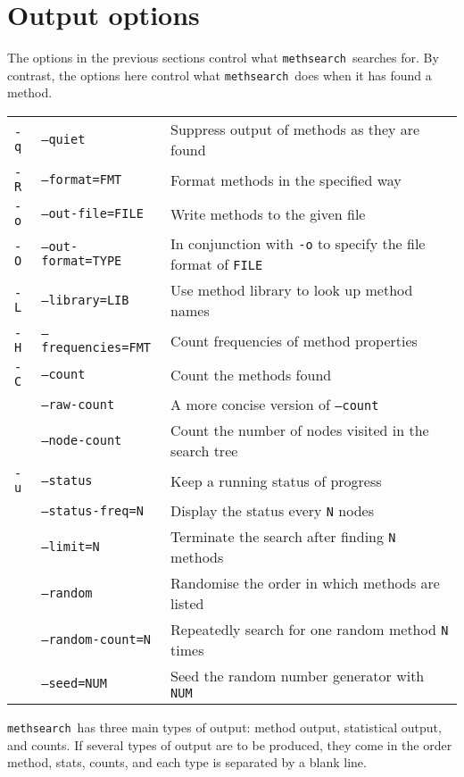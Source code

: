 \documentclass[a4paper,11pt,oneside]{book}
\def\methsearch{\texttt{meth\-search}}
\begin{document}

\section{Output options}\label{output_opt}

The options in the previous sections control what
\methsearch\ searches for.  By contrast, the options here control
what \methsearch\ does when it has found a method.

\begin{tabularx}{\textwidth}{llX}
\texttt{-q}&\texttt{--quiet}&Suppress output of methods as they are found\\
\texttt{-R}&\texttt{--format=FMT}&Format methods in the specified way\\
\texttt{-o}&\texttt{--out-file=FILE}&Write methods to the given file\\
\texttt{-O}&\texttt{--out-format=TYPE}&
  In conjunction with \texttt{-o} to specify the file format of \texttt{FILE}\\
\texttt{-L}&\texttt{--library=LIB}&Use method library to look up method names\\
\texttt{-H}&\texttt{--frequencies=FMT}&Count frequencies of method properties\\
\texttt{-C}&\texttt{--count}&Count the methods found\\
&\texttt{--raw-count}&A more concise version of \texttt{--count}\\
&\texttt{--node-count}&Count the number of nodes visited in the search tree\\
\texttt{-u}&\texttt{--status}&Keep a running status of progress\\
&\texttt{--status-freq=N}&Display the status every \texttt{N} nodes\\
&\texttt{--limit=N}&Terminate the search after finding \texttt{N} methods\\
&\texttt{--random}&Randomise the order in which methods are listed\\
&\texttt{--random-count=N}&
  Repeatedly search for one random method \texttt{N} times\\
&\texttt{--seed=NUM}&Seed the random number generator with \texttt{NUM}\\
\end{tabularx}

\methsearch\ has three main types of output: method output,
statistical output, and counts.  If several types of output are to be
produced, they come in the order method, stats, counts, and each type
is separated by a blank line.
\end{document}
